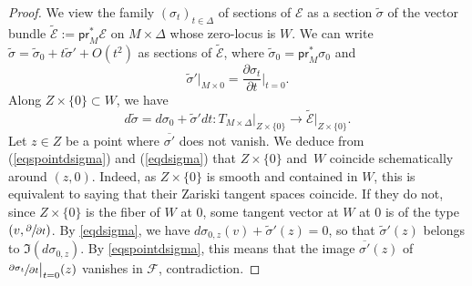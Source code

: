 \documentclass[JEP,XML,SOM,Unicode, NoEqCountersInSection,NoFloatCountersInSection]{cedram}
\let\mathcal\mathscr
\theoremstyle{definition}
\newcommand\cE{\mathcal{E}}
\newcommand\cF{\mathcal{F}}
\newcommand{\pr}{\mathsf{pr}}
\begin{document}
\begin{proof}
We view the family $(\sigma_t)_{t\in \Delta}$ of sections of $\cE$ as a section $\widetilde\sigma$
of the vector bundle $\widetilde{\cE}:=\pr_M^* \cE$
on $M\times \Delta$ whose zero-locus is $W$. We can write $\widetilde\sigma=\widetilde\sigma_0+t\widetilde\sigma'+O(t^2)$ as sections of $\widetilde{\cE}$, where
$\widetilde\sigma_0=\pr_M^*\sigma_0$ and
\begin{equation}\label{eqspointdsigma}
\widetilde \sigma'\vert_{ M\times 0}=\frac{\partial\sigma_t}{\partial t}\Big\vert_{t=0}
.
\end{equation}
Along $Z\times \{0\}\subset W $, we have
\begin{equation}\label{eqdsigma}
d\widetilde\sigma=d \sigma_0+\widetilde\sigma' dt\colon T_{M\times\Delta}\vert_{Z\times \{0\}} \to \widetilde{\cE}\vert_{Z\times \{0\}}.
\end{equation}
Let $z\in Z$ be a point where $\overline {\sigma'} $ does not vanish. We deduce from (\ref{eqspointdsigma}) and (\ref{eqdsigma}) that $Z\times \{0\}$ and~$W$ coincide schematically around $(z,0)$. Indeed, as $Z\times \{0\}$ is smooth and contained in $W$, this is equivalent to saying that their Zariski tangent spaces
coincide. If they do not, since $Z\times \{0\}$ is the fiber of $W$ at $0$, some tangent vector at $W$ at $0$ is of the type $ (v,\sfrac{\partial}{\partial t})$. By \eqref{eqdsigma}, we have
$d \sigma_{0,z}(v)+\widetilde\sigma'(z)=0$, so that $\widetilde\sigma'(z)$ belongs to $\Im (d \sigma_{0,z})$. By \eqref{eqspointdsigma}, this means that the image $\overline {\sigma'} (z) $ of
$\sfrac{\partial\sigma_t}{\partial t}\big\vert_{t=0}(z)$ vanishes in $\cF$, contradiction.


\end{proof}
\end{document}
